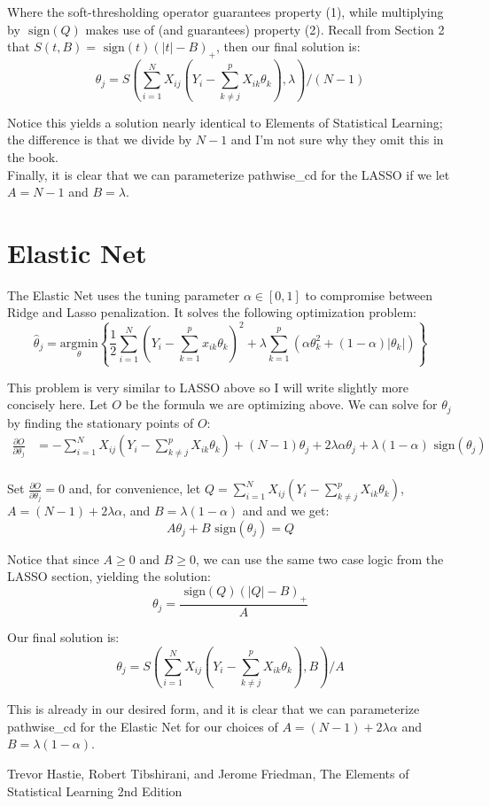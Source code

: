 \documentclass[12pt]{article}
\newcommand{\thh}{\hat{\theta}}
\newcommand{\sgn}{\text{ sign}}
\begin{document}
Where the soft-thresholding operator guarantees property (1), while multiplying by $\sgn(Q)$ makes use of (and guarantees) property (2).  Recall from Section 2 that $S(t,B) = \sgn(t)(|t|-B)_+$, then our final solution is:
	$$\theta_j = S\left(\sum\limits_{i=1}^N X_{ij}(Y_i - \sum\limits_{k \ne j}^p X_{ik}\theta_k), \lambda\right)/(N-1)$$

Notice this yields a solution nearly identical to Elements of Statistical Learning\cite{ht}; the difference is that we divide by $N-1$ and I'm not sure why they omit this in the book.  \\

Finally, it is clear that we can parameterize pathwise\_cd for the LASSO if we let $A=N-1$ and $B=\lambda$.  


\section{Elastic Net}
The Elastic Net uses the tuning parameter $\alpha \in [0,1]$ to compromise between Ridge and Lasso penalization.  It solves the following optimization problem:
	$$\thh_j = \underset{\theta}{\text{argmin}}\left\{ \frac{1}{2} \sum\limits_{i=1}^N \left(Y_i - \sum\limits_{k=1}^px_{ik}\theta_k \right)^2 + \lambda \sum\limits_{k=1}^p \left(\alpha\theta_k^2 + (1-\alpha)|\theta_k| \right) \right\}$$

This problem is very similar to LASSO above so I will write slightly more concisely here.  Let $O$ be the formula we are optimizing above.  We can solve for $\theta_j$ by finding the stationary points of $O$:
\begin{equation}\begin{split}
	\frac{\partial O}{\partial \theta_j}
		& = -\sum\limits_{i=1}^N X_{ij}(Y_i - \sum\limits_{k \ne j}^p X_{ik}\theta_k) +(N-1)\theta_j + 2\lambda\alpha\theta_j + \lambda(1-\alpha)\sgn(\theta_j) \\
\end{split}\end{equation}

Set $\frac{\partial O}{\partial \theta_j}=0$ and, for convenience, let $Q = \sum\limits_{i=1}^N X_{ij}(Y_i - \sum\limits_{k \ne j}^p X_{ik}\theta_k)$, $A=(N-1)+2\lambda\alpha$, and $B=\lambda(1-\alpha)$ and and we get:
	$$A\theta_j + B\sgn(\theta_j) = Q$$

Notice that since $A \geq 0$ and $B \geq 0$, we can use the same two case logic from the LASSO section, yielding the solution:
	$$\theta_j = \frac{\sgn(Q)(|Q|-B)_+}{A}$$

Our final solution is:
	$$\theta_j = S\left(\sum\limits_{i=1}^N X_{ij}(Y_i - \sum\limits_{k \ne j}^p X_{ik}\theta_k), B\right)/A$$

This is already in our desired form, and it is clear that we can parameterize pathwise\_cd for the Elastic Net for our choices of $A=(N-1)+2\lambda\alpha$ and $B=\lambda(1-\alpha)$.  

\begin{thebibliography}{9}
Trevor Hastie, Robert Tibshirani, and Jerome Friedman,
The Elements of Statistical Learning 2nd Edition
\end{thebibliography}
\end{document}
